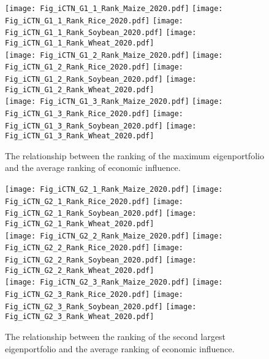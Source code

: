 \documentclass[preprint,3p,times,sort&compress]{elsarticle}
\begin{document}
 \begin{figure}[h!]
      \centering
      \texttt{[image: Fig\_iCTN\_G1\_1\_Rank\_Maize\_2020.pdf]}
      \texttt{[image: Fig\_iCTN\_G1\_1\_Rank\_Rice\_2020.pdf]}
      \texttt{[image: Fig\_iCTN\_G1\_1\_Rank\_Soybean\_2020.pdf]}
      \texttt{[image: Fig\_iCTN\_G1\_1\_Rank\_Wheat\_2020.pdf]}\\
      \texttt{[image: Fig\_iCTN\_G1\_2\_Rank\_Maize\_2020.pdf]}
      \texttt{[image: Fig\_iCTN\_G1\_2\_Rank\_Rice\_2020.pdf]}
      \texttt{[image: Fig\_iCTN\_G1\_2\_Rank\_Soybean\_2020.pdf]}
      \texttt{[image: Fig\_iCTN\_G1\_2\_Rank\_Wheat\_2020.pdf]}\\
      \texttt{[image: Fig\_iCTN\_G1\_3\_Rank\_Maize\_2020.pdf]}
      \texttt{[image: Fig\_iCTN\_G1\_3\_Rank\_Rice\_2020.pdf]}
      \texttt{[image: Fig\_iCTN\_G1\_3\_Rank\_Soybean\_2020.pdf]}
      \texttt{[image: Fig\_iCTN\_G1\_3\_Rank\_Wheat\_2020.pdf]}\\
      \caption{The relationship between the ranking of the maximum eigenportfolio and the average ranking of economic influence.}
      \label{Fig:G1:rank}
\end{figure} 



 \begin{figure}[h!]
      \centering
      \texttt{[image: Fig\_iCTN\_G2\_1\_Rank\_Maize\_2020.pdf]}
      \texttt{[image: Fig\_iCTN\_G2\_1\_Rank\_Rice\_2020.pdf]}
      \texttt{[image: Fig\_iCTN\_G2\_1\_Rank\_Soybean\_2020.pdf]}
      \texttt{[image: Fig\_iCTN\_G2\_1\_Rank\_Wheat\_2020.pdf]}\\
      \texttt{[image: Fig\_iCTN\_G2\_2\_Rank\_Maize\_2020.pdf]}
      \texttt{[image: Fig\_iCTN\_G2\_2\_Rank\_Rice\_2020.pdf]}
      \texttt{[image: Fig\_iCTN\_G2\_2\_Rank\_Soybean\_2020.pdf]}
      \texttt{[image: Fig\_iCTN\_G2\_2\_Rank\_Wheat\_2020.pdf]}\\
      \texttt{[image: Fig\_iCTN\_G2\_3\_Rank\_Maize\_2020.pdf]}
      \texttt{[image: Fig\_iCTN\_G2\_3\_Rank\_Rice\_2020.pdf]}
      \texttt{[image: Fig\_iCTN\_G2\_3\_Rank\_Soybean\_2020.pdf]}
      \texttt{[image: Fig\_iCTN\_G2\_3\_Rank\_Wheat\_2020.pdf]}\\
      \caption{The relationship between the ranking of the second largest eigenportfolio and the average ranking of economic influence.}
      \label{Fig:G2:rank}
\end{figure}
\end{document}
